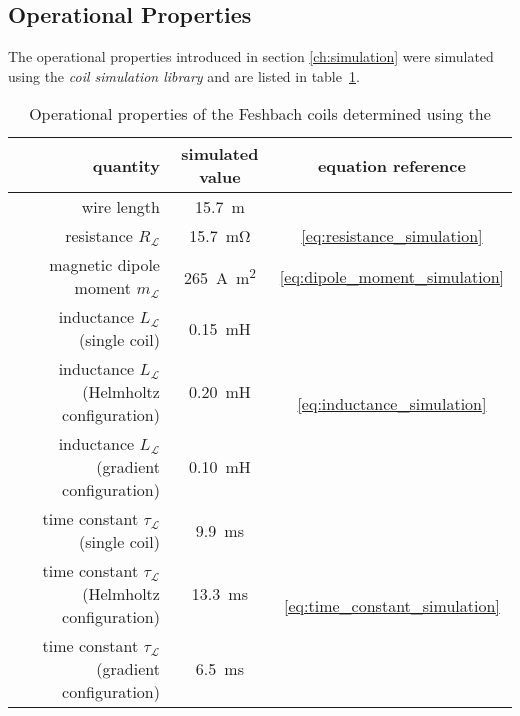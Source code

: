 \subsection*{Operational Properties}
The operational properties introduced in section \ref{ch:simulation} were simulated using the \textit{coil simulation library} and are listed in table~\ref{tab:operational_properties}.

\begin{table}
    \centering
    \begin{tabular}{rcc}
        \toprule
        \textbf{quantity} & \textbf{simulated value}  & \textbf{equation reference} \\
        \toprule
        wire length & \SI{15.7}{\meter} & \\
        resistance $R_\mathcal{L}$ & \SI{15.7}{\milli\ohm} & \eqref {eq:resistance_simulation} \\
        magnetic dipole moment $m_\mathcal{L}$ & \SI{265}{\ampere\square\meter} & \eqref{eq:dipole_moment_simulation} \\
        \midrule
        inductance $L_\mathcal{L}$ (single coil) & \SI{0.15}{\milli\henry} & \multirow{3}{*}{\eqref{eq:inductance_simulation}} \\ 
        inductance $L_\mathcal{L}$ (Helmholtz configuration) & \SI{0.20}{\milli\henry} & \\ 
        inductance $L_\mathcal{L}$ (gradient configuration) & \SI{0.10}{\milli\henry} & \\ 
        \midrule
        time constant $\tau_\mathcal{L}$ (single coil) & \SI{9.9}{\milli\second} & \multirow{3}{*}{\eqref{eq:time_constant_simulation}}\\
        time constant $\tau_\mathcal{L}$ (Helmholtz configuration) & \SI{13.3}{\milli\second} & \\
        time constant $\tau_\mathcal{L}$ (gradient configuration) & \SI{6.5}{\milli\second} & \\
        \bottomrule
    \end{tabular}
    \caption{Operational properties of the Feshbach coils determined using the }
    \label{tab:operational_properties}
\end{table}


